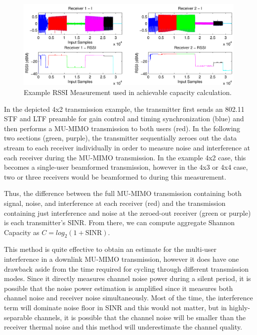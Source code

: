 \begin{figure}[ht]
\centering
  	\includegraphics[width=6in]{figs/exTrans}   
   	\caption{Example RSSI Measurement used in achievable capacity calculation.
	\label{fig_exTrans}}
\end{figure}

	In the depicted 4x2 transmission example, the transmitter first sends an 802.11 \ac{STF} and \ac{LTF} preamble for gain control and timing synchronization (blue) and then performs a MU-MIMO transmission to both users (red).
	In the following two sections (green, purple), the transmitter sequentially zeroes out the data stream to each receiver individually in order to measure noise and interference at each receiver during the \ac{MU-MIMO} transmission.
	In the example 4x2 case, this becomes a single-user beamformed transmission, however in the 4x3 or 4x4 case, two or three receivers would be beamformed to during this measurement.

	Thus, the difference between the full MU-MIMO transmission containing both signal, noise, and interference at each receiver (red) and the transmission containing just interference and noise at the zeroed-out receiver (green or purple) is each transmitter's SINR.
	From there, we can compute aggregate Shannon Capacity as $C=log_2(1+\text{SINR})$.

	This method is quite effective to obtain an estimate for the multi-user interference in a downlink \ac{MU-MIMO} transmission, however it does have one drawback aside from the time required for cycling through different transmission modes.%
	Since it directly measures channel noise power during a silent period, it is possible that the noise power estimation is amplified since it measures both channel noise and receiver noise simultaneously.
	Most of the time, the interference term will dominate noise floor in \ac{SINR} and this would not matter, but in highly-separable channels, it is possible that the channel noise will be smaller than the receiver thermal noise and this method will underestimate the channel quality.


